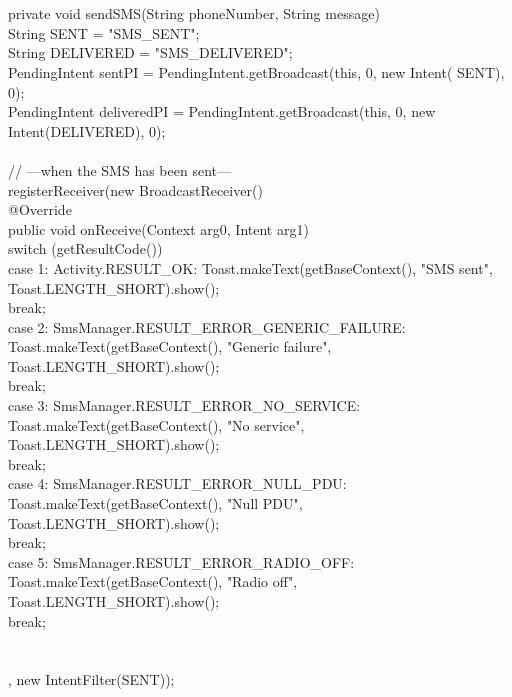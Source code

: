 \documentclass[12pt,a4paper]{article}
\begin{document}
{{{	}\\
\\
	private void sendSMS(String phoneNumber, String message) {\\
		String SENT = "SMS_SENT";\\
		String DELIVERED = "SMS_DELIVERED";\\

		PendingIntent sentPI = PendingIntent.getBroadcast(this, 0, new Intent(
				SENT), 0);\\

		PendingIntent deliveredPI = PendingIntent.getBroadcast(this, 0,
				new Intent(DELIVERED), 0);\\
\\
		// ---when the SMS has been sent---\\
		registerReceiver(new BroadcastReceiver() {\\
			@Override\\
			public void onReceive(Context arg0, Intent arg1) {\\
				switch (getResultCode()) {\\
				case 1: Activity.RESULT_OK:
					Toast.makeText(getBaseContext(), "SMS sent",
							Toast.LENGTH_SHORT).show();\\
					break;\\
				case 2: SmsManager.RESULT_ERROR_GENERIC_FAILURE:\\
					Toast.makeText(getBaseContext(), "Generic failure",
							Toast.LENGTH_SHORT).show();\\
					break;\\
				case 3: SmsManager.RESULT_ERROR_NO_SERVICE:\\
					Toast.makeText(getBaseContext(), "No service",
							Toast.LENGTH_SHORT).show();\\
					break;\\
				case 4: SmsManager.RESULT_ERROR_NULL_PDU:\\
					Toast.makeText(getBaseContext(), "Null PDU",
							Toast.LENGTH_SHORT).show();\\
					break;\\
				case 5: SmsManager.RESULT_ERROR_RADIO_OFF:\\
					Toast.makeText(getBaseContext(), "Radio off",
							Toast.LENGTH_SHORT).show();\\
					break;\\
				}\\
			}\\
		}, new IntentFilter(SENT));\\
}}}
\end{document}
